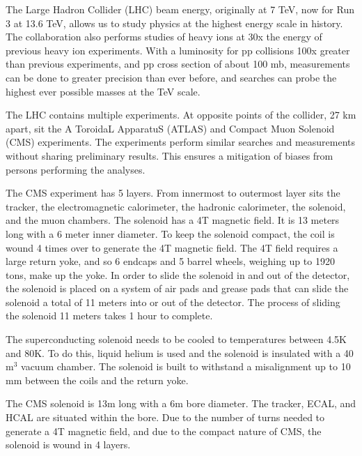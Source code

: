 The Large Hadron Collider (LHC) beam energy, originally at 7 TeV, now for Run 3 at 13.6 TeV, allows us to study physics at the highest energy scale in history. The collaboration also performs studies of heavy ions at 30x the energy of previous heavy ion experiments. With a luminosity for pp collisions 100x greater than previous experiments, and pp cross section of about 100 mb, measurements can be done to greater precision than ever before, and searches can probe the highest ever possible masses at the TeV scale.

The LHC contains multiple experiments. At opposite points of the collider, 27 km apart, sit the A ToroidaL ApparatuS (ATLAS) and Compact Muon Solenoid (CMS) experiments. The experiments perform similar searches and measurements without sharing preliminary results. This ensures a mitigation of biases from persons performing the analyses.

The CMS experiment has 5 layers. From innermost to outermost layer sits the tracker, the electromagnetic calorimeter, the hadronic calorimeter, the solenoid, and the muon chambers. The solenoid has a 4T magnetic field. It is 13 meters long with a 6 meter inner diameter. To keep the solenoid compact, the coil is wound 4 times over to generate the 4T magnetic field. The 4T field requires a large return yoke, and so 6 endcaps and 5 barrel wheels, weighing up to 1920 tons, make up the yoke. In order to slide the solenoid in and out of the detector, the solenoid is placed on a system of air pads and grease pads that can slide the solenoid a total of 11 meters into or out of the detector. The process of sliding the solenoid 11 meters takes 1 hour to complete.

The superconducting solenoid needs to be cooled to temperatures between 4.5K and 80K. To do this, liquid helium is used and the solenoid is insulated with a 40 m$^3$ vacuum chamber. The solenoid is built to withstand a misalignment up to 10 mm between the coils and the return yoke.

The CMS solenoid is 13m long with a 6m bore diameter. The tracker, ECAL, and HCAL are situated within the bore. Due to the number of turns needed to generate a 4T magnetic field, and due to the compact nature of CMS, the solenoid is wound in 4 layers.


